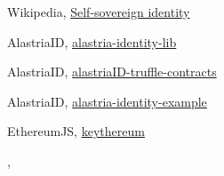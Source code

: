 \documentclass[target=mst,aauheader=]{thud}
\begin{document}
\begin{thebibliography}{99}
    Wikipedia, \href{https://en.wikipedia.org/wiki/Self-sovereign_identity}{Self-sovereign identity}

    AlastriaID, \href{https://github.com/alastria/alastria-identity-lib}{alastria-identity-lib}

    AlastriaID, \href{https://github.com/alastria/alastriaID-truffle-contracts}{alastriaID-truffle-contracts}

    AlastriaID, \href{https://github.com/alastria/alastria-identity-example}{alastria-identity-example}

    EthereumJS, \href{https://github.com/ethereumjs/keythereum}{keythereum}

    \bibitem{}
    , \href{}{}

\end{thebibliography}

\end{document}
